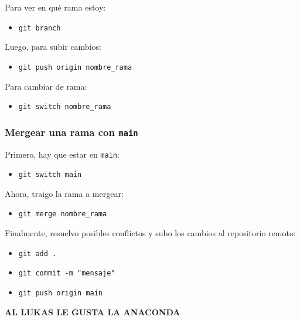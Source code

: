 \documentclass{article} %
\begin{document}
Para ver en qué rama estoy:

\begin{itemize}
    \item \texttt{git branch}
\end{itemize}

Luego, para subir cambios:

\begin{itemize}
    \item \texttt{git push origin nombre\_rama}
\end{itemize}

Para cambiar de rama:

\begin{itemize}
    \item \texttt{git switch nombre\_rama}
\end{itemize}

\subsubsection{Mergear una rama con \texttt{main}}

Primero, hay que estar en \texttt{main}:

\begin{itemize}
    \item \texttt{git switch main}
\end{itemize}

Ahora, traigo la rama a mergear:

\begin{itemize}
    \item \texttt{git merge nombre\_rama}
\end{itemize}

Finalmente, resuelvo posibles conflictos y subo los cambios al repositorio remoto:

\begin{itemize}
    \item \texttt{git add .}
    \item \texttt{git commit -m "mensaje"}
    \item \texttt{git push origin main}
\end{itemize}

\huge\textbf{AL LUKAS LE GUSTA LA ANACONDA}
\end{document}
